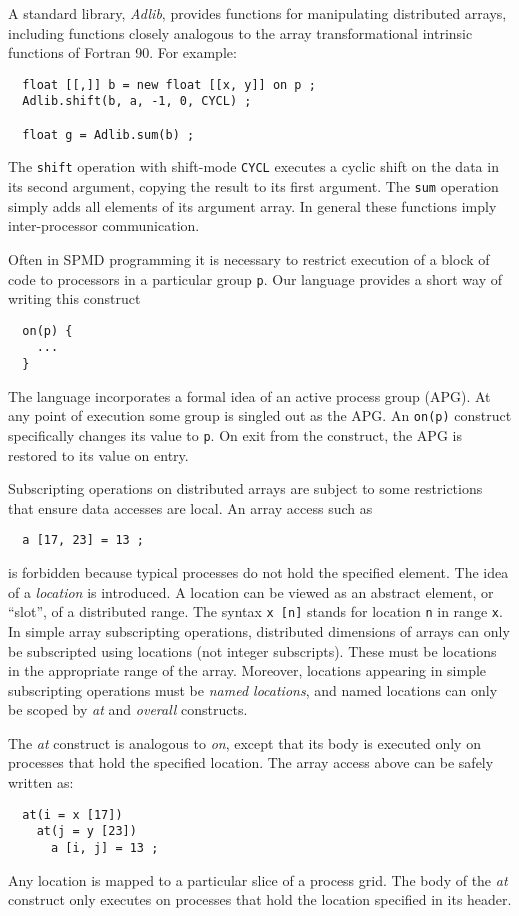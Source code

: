 A standard library, {\em Adlib}, provides functions for manipulating
distributed arrays, including functions closely analogous to the array
transformational intrinsic functions of Fortran 90.  For example:
\small
\begin{verbatim}
  float [[,]] b = new float [[x, y]] on p ;
  Adlib.shift(b, a, -1, 0, CYCL) ;

  float g = Adlib.sum(b) ;
\end{verbatim}
\normalsize
The {\tt shift} operation with shift-mode {\tt CYCL} executes a cyclic
shift on the data in its second argument, copying the result to its
first argument.  The {\tt sum} operation simply adds all elements of
its argument array.
In general these functions imply inter-processor communication.

Often in SPMD programming it is necessary to restrict execution
of a block of code to processors in a particular group {\tt p}.
Our language provides a short way of writing this construct
\small
\begin{verbatim}
  on(p) {
    ...
  }
\end{verbatim}
\normalsize
The language incorporates a formal idea of an active process group
(APG).  At any point of execution some group is singled out as
the APG.  An {\tt on(p)} construct specifically changes its value
to {\tt p}.  On exit from the construct, the APG is restored to
its value on entry.

Subscripting operations on distributed arrays are subject to some
restrictions that ensure data accesses are local.  An array access such as
\small
\begin{verbatim}
  a [17, 23] = 13 ;
\end{verbatim}
\normalsize
is forbidden because typical processes do not hold the specified element.
The idea of a {\em location} is introduced.  A location can be viewed
as an abstract element, or ``slot'', of a distributed range.
The syntax {\tt x\,[n]} stands for location {\tt n} in range {\tt x}.
In simple array subscripting operations, distributed dimensions of
arrays can only be subscripted using locations (not integer
subscripts).  These must be locations in the appropriate range of the
array.  Moreover, locations appearing in simple subscripting operations
must be {\em named locations}, and named locations can only be scoped
by {\em at} and {\em overall} constructs.

The {\em at} construct is analogous to {\em on}, except that its
body is executed only on processes that hold the specified location.
The array access above can be safely written as:
\small
\begin{verbatim}
  at(i = x [17])
    at(j = y [23])
      a [i, j] = 13 ;
\end{verbatim}
\normalsize
Any location is mapped to a particular slice of a process grid.  
The body of the {\em at} construct only executes on processes that
hold the location specified in its header.

